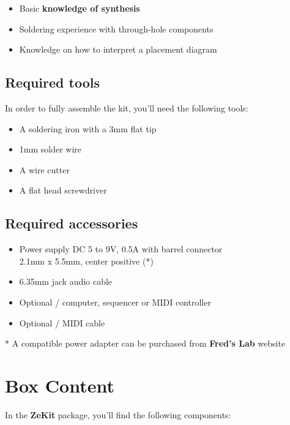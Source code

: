 \documentclass{scrartcl}
\begin{document}
\begin{itemize}
    \item Basic \textbf{knowledge of synthesis}
    \item Soldering experience with through-hole components
    \item Knowledge on how to interpret a placement diagram
\end{itemize}

\subsection{Required tools}

In order to fully assemble the kit, you'll need the following tools:

\begin{itemize}
    \item A soldering iron with a 3mm flat tip
    \item 1mm solder wire
    \item A wire cutter
    \item A flat head screwdriver
\end{itemize}

\subsection{Required accessories}

\begin{itemize}
    \item Power supply DC 5 to 9V, 0.5A with barrel connector \\
    2.1mm x 5.5mm, center positive (*)
    \item 6.35mm jack audio cable
    \item Optional / computer, sequencer or MIDI controller
    \item Optional / MIDI cable
\end{itemize}

* A compatible power adapter can be purchased from \textbf{Fred's Lab} website

\pagebreak
\section{Box Content}

In the \textbf{ZeKit} package, you'll find the following components:
\vspace{-0.25cm}
\end{document}
